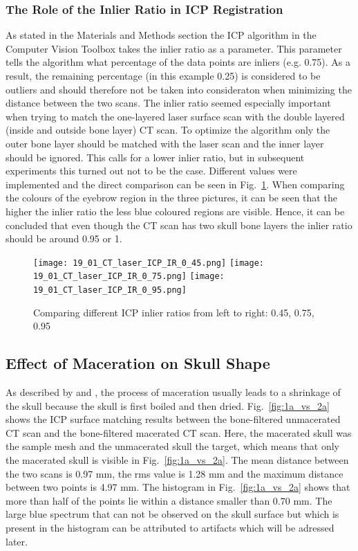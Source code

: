 \documentclass[a4paper]{article}
\begin{document}
\subsubsection{The Role of the Inlier Ratio in ICP Registration}
As stated in the Materials and Methods section the ICP algorithm in the Computer Vision Toolbox takes the inlier ratio as a parameter. This parameter tells the algorithm what percentage of the data points are inliers (e.g. 0.75). As a result, the remaining percentage (in this example 0.25) is considered to be outliers and should therefore not be taken into consideraton when minimizing the distance between the two scans. The inlier ratio seemed especially important when trying to match the one-layered laser surface scan with the double layered (inside and outside bone layer) CT scan. To optimize the algorithm only the outer bone layer should be matched with the laser scan and the inner layer should be ignored. This calls for a lower inlier ratio, but in subsequent experiments this turned out not to be the case. Different values were implemented and the direct comparison can be seen in Fig.~\ref{fig:inlier_ratio}. When comparing the colours of the eyebrow region in the three pictures, it can be seen that the higher the inlier ratio the less blue coloured regions are visible. Hence, it can be concluded that even though the CT scan has two skull bone layers the inlier ratio should be around 0.95 or 1.

\begin {figure} [ht!]
\centering
\texttt{[image: 19\_01\_CT\_laser\_ICP\_IR\_0\_45.png]}%
\hspace{0.25cm}
\texttt{[image: 19\_01\_CT\_laser\_ICP\_IR\_0\_75.png]}
\hspace{0.1cm}
\texttt{[image: 19\_01\_CT\_laser\_ICP\_IR\_0\_95.png]}
\caption{\label{fig:inlier_ratio}Comparing different ICP inlier ratios from left to right: 0.45, 0.75, 0.95}
\end{figure}
\pagebreak
\subsection{Effect of Maceration on Skull Shape} %
As described by \cite{de1990value} and \cite{todd1923effect}, the process of maceration usually leads to a shrinkage of the skull because the skull is first boiled and then dried. Fig.~\ref{fig:1a_vs_2a} shows the ICP surface matching results between the bone-filtered unmacerated CT scan and the bone-filtered macerated CT scan. Here, the macerated skull was the sample mesh and the unmacerated skull the target, which means that only the macerated skull is visible in Fig.~\ref{fig:1a_vs_2a}. The mean distance between the two scans is 0.97 mm, the rms value is 1.28 mm and the maximum distance between two points is 4.97 mm. The histogram in Fig.~\ref{fig:1a_vs_2a} shows that more than half of the points lie within a distance smaller than 0.70 mm. The large blue spectrum that can not be observed on the skull surface but which is present in the histogram can be attributed to artifacts which will be adressed later. 
\end{document}
